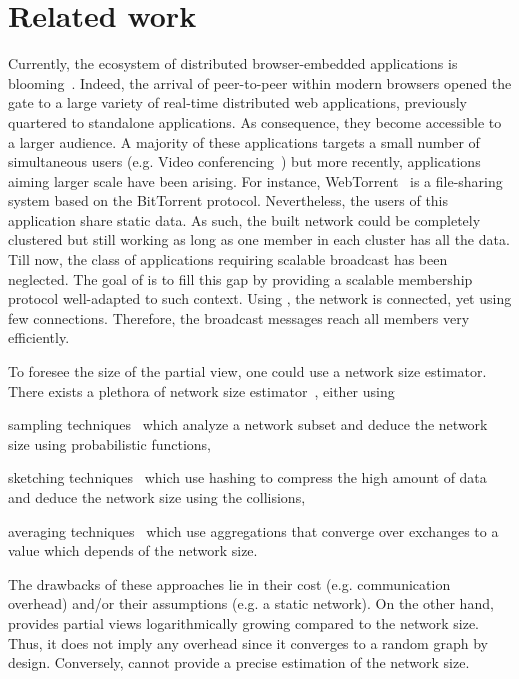 
\section{Related work}
\label{sec:relatedwork}

Currently, the ecosystem of distributed browser-embedded applications is
blooming~\cite{firefoxhello,sharefest,webtorrent}. Indeed, the arrival of
peer-to-peer within modern browsers opened the gate to a large variety of
real-time distributed web applications, previously quartered to standalone
applications. As consequence, they become accessible to a larger audience. A
majority of these applications targets a small number of simultaneous users
(e.g. Video conferencing~\cite{firefoxhello}) but more recently, applications
aiming larger scale have been arising. For instance,
WebTorrent~\cite{webtorrent} is a file-sharing system based on the BitTorrent
protocol. Nevertheless, the users of this application share static data. As
such, the built network could be completely clustered but still working as long
as one member in each cluster has all the data.  Till now, the class of
applications requiring scalable broadcast has been neglected. The goal of
\SCAMPLON{} is to fill this gap by providing a scalable membership protocol
well-adapted to such context. Using \SCAMPLON{}, the network is connected, yet
using few connections. Therefore, the broadcast messages reach all members very
efficiently.

To foresee the size of the partial view, one could use a network size
estimator. There exists a plethora of network size
estimator~\cite{jelasity2004epidemic, ganesh2007peer, kostoulas2007active,
  baquero2012extrema}, either using
\begin{inparaenum}[(i)]
\item sampling techniques~\cite{mane05network, ganesh2007peer,
    kostoulas2007active} which analyze a network subset and deduce the network
  size using probabilistic functions,
\item sketching techniques~\cite{baquero2012extrema} which use hashing to
  compress the high amount of data and deduce the network size using the
  collisions,
\item averaging techniques~\cite{jelasity2004epidemic} which use aggregations
  that converge over exchanges to a value which depends of the network size.
\end{inparaenum}
The drawbacks of these approaches lie in their cost (e.g. communication
overhead) and/or their assumptions (e.g. a static network). On the other hand,
\SCAMPLON{} provides partial views logarithmically growing compared to the
network size. Thus, it does not imply any overhead since it converges to a
random graph by design. Conversely, \SCAMPLON{} cannot provide a precise
estimation of the network size.

